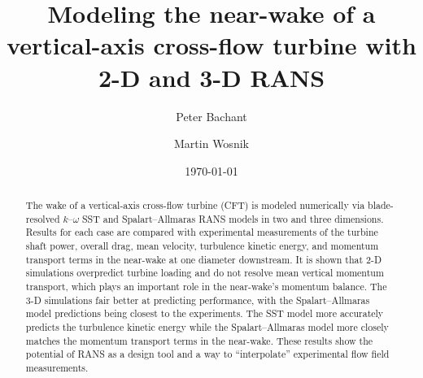 \documentclass[aip,graphicx]{revtex4-1}
\begin{document}
\preprint{}

\title{Modeling the near-wake of a vertical-axis cross-flow turbine with 2-D and
    3-D RANS}



\author{Peter Bachant}

\author{Martin Wosnik}


\date{\today}

\begin{abstract}
The wake of a vertical-axis cross-flow turbine (CFT) is modeled numerically via
blade-resolved $k$--$\omega$ SST and Spalart--Allmaras RANS models in two and
three dimensions. Results for each case are compared with experimental
measurements of the turbine shaft power, overall drag, mean velocity, turbulence
kinetic energy, and momentum transport terms in the near-wake at one diameter
downstream. It is shown that 2-D simulations overpredict turbine loading and do
not resolve mean vertical momentum transport, which plays an important role in
the near-wake's momentum balance. The 3-D simulations fair better at predicting
performance, with the Spalart--Allmaras model predictions being closest to the
experiments. The SST model more accurately predicts the turbulence kinetic
energy while the Spalart--Allmaras model more closely matches the momentum
transport terms in the near-wake. These results show the potential of RANS as a
design tool and a way to ``interpolate'' experimental flow field measurements.
\end{abstract}
\end{document}
